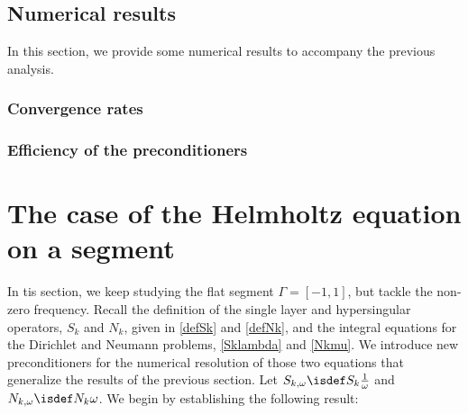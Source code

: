 \documentclass[a4paper]{article}
\begin{document}
	
	\subsection{Numerical results}
	
	In this section, we provide some numerical results to accompany the previous analysis. 
	
	
	
	\paragraph{}
	
	
	\subsubsection{Convergence rates}
	\subsubsection{Efficiency of the preconditioners}
	
	
	\section{The case of the Helmholtz equation on a segment}
	
	In tis section, we keep studying the flat segment $\Gamma = [-1,1]$, but tackle the non-zero frequency. Recall the definition of the single layer and hypersingular operators, $S_k$ and $N_k$, given in \eqref{defSk} and \eqref{defNk}, and the integral equations for the Dirichlet and Neumann problems, \eqref{Sklambda} and \eqref{Nkmu}. We introduce new preconditioners for the numerical resolution of those two equations that generalize the results of the previous section.  Let $S_{k,\omega} \isdef S_k \frac{1}{\omega}$ and $N_{k,\omega} \isdef N_k \omega$. We begin by establishing the following result:
	
\end{document}
